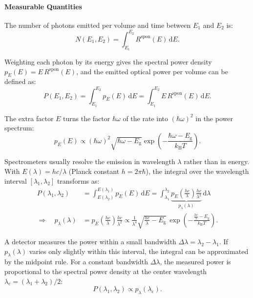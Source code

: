 \paragraph{Measurable Quantities}

The number of photons emitted per volume and time between $E_{1}$ and $E_{2}$ is:
\begin{equation}
	N(E_{1}, E_{2}) = \int_{E_1}^{E_2}R^{\mathrm{spon}}(E) \, \mathrm{d}E.
\end{equation}

Weighting each photon by its energy gives the spectral power density $p_{E}(E)=E\,
R^{\mathrm{spon}}(E)$, and the emitted optical power per volume can be defined as:
\begin{equation}
	P(E_{1}, E_{2})=\int_{E_1}^{E_2}p_{E}(E) \, \mathrm{d}E = \int_{E_1}^{E_2}E \, R
	^{\mathrm{spon}}(E) \, \mathrm{d}E.
\end{equation}

The extra factor $E$ turns the factor $\hbar\omega$ of the rate into $(\hbar\omega
)^{2}$ in the power spectrum:
\begin{equation}
	p_{E}(E)\propto (\hbar\omega)^{2}\sqrt{ \hbar \omega-E_{\mathrm{g}}}\exp\left( -
	\frac{\hbar \omega-E_{\mathrm{g}}}{k_{\mathrm{B}}T}\right).
\end{equation}

Spectrometers usually resolve the emission in wavelength $\lambda$ rather than in energy.
With $E(\lambda)=hc/\lambda$ (Planck constant $h=2\pi\hbar$), the integral over the
wavelength interval $[\lambda_{1},\lambda_{2}]$ transforms as:
\begin{align}
	P(\lambda_{1}, \lambda_{2})           & =\int_{E(\lambda_{2})}^{E(\lambda_{1})}p_{E}(E)\,\mathrm{d}E=\int_{\lambda_1}^{\lambda_2}\underbrace{p_{E}\!\left(\frac{hc}{\lambda}\right)\frac{hc}{\lambda^{2}}}_{p_{\lambda}(\lambda)}\,\mathrm{d}\lambda                          \\
	\Rightarrow\quad p_{\lambda}(\lambda) & =p_{E}\!\left(\frac{hc}{\lambda}\right)\frac{hc}{\lambda^{2}}\propto\frac{1}{\lambda^{4}}\sqrt{\frac{hc}{\lambda}-E_{\mathrm{g}}}\,\exp\left( -\frac{\frac{hc}{\lambda}-E_{\mathrm{g}}}{k_{\mathrm{B}}T}\right).
	\label{eq:spontaneous_emission_line_shape}
\end{align}

A detector measures the power within a small bandwidth $\Delta\lambda=\lambda
_{2}-\lambda_{1}$. If $p_{\lambda}(\lambda)$ varies only slightly within this
interval, the integral can be approximated by the midpoint rule. For a constant
bandwidth $\Delta\lambda$, the measured power is proportional to the spectral power
density at the center wavelength $\lambda_{\mathrm{c}}=(\lambda_{1}+\lambda_{2})/2$:
\begin{equation}
	P(\lambda_{1},\lambda_{2})\propto p_{\lambda}(\lambda_{\mathrm{c}}).
\end{equation}